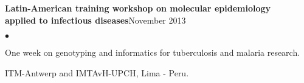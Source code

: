 \documentclass[margin,line]{res}
\newenvironment{list2}{
  \begin{list}{$\bullet$}{%
      \setlength{\itemsep}{0in}
      \setlength{\parsep}{0in} \setlength{\parskip}{0in}
      \setlength{\topsep}{0in} \setlength{\partopsep}{0in}
      \setlength{\leftmargin}{0.2in}}}{\end{list}}
\begin{document}
\begin{resume}




{\bf Latin-American training workshop on molecular epidemiology \\applied to infectious diseases}\hfill {November 2013}\\
	\vspace*{-.1in}%
\begin{list2} %
	\item One week on genotyping and informatics for tuberculosis and malaria research. %
	\item ITM-Antwerp and IMTAvH-UPCH, Lima - Peru.\\%
\end{list2}


\end{resume}
\end{document}

